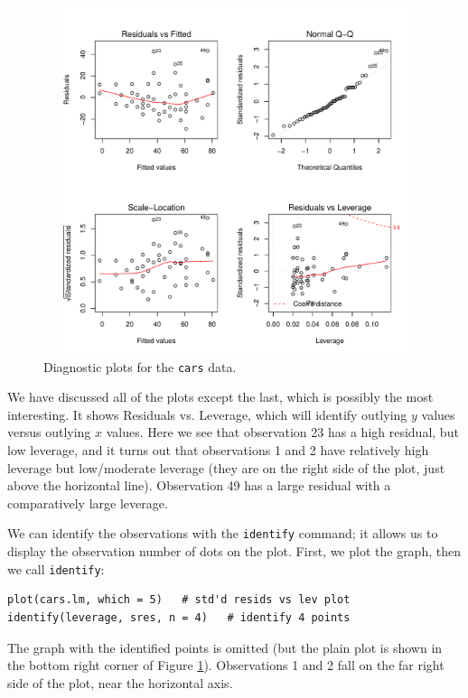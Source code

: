 \documentclass[captions=tableheading]{scrbook}
\begin{document}
\begin{figure}[ht!]
  \includegraphics[width=5in, height=4in]{img/Diagnostic-plots-cars.pdf}
  \caption[Diagnostic plots for the \texttt{cars} data]{\small Diagnostic plots for the \texttt{cars} data.}
  \label{fig:Diagnostic-plots-cars}
\end{figure}



We have discussed all of the plots except the last, which is possibly the most interesting. It shows Residuals vs. Leverage, which will identify outlying \(y\) values versus outlying \(x\) values. Here we see that observation 23 has a high residual, but low leverage, and it turns out that observations 1 and 2 have relatively high leverage but low/moderate leverage (they are on the right side of the plot, just above the horizontal line). Observation 49 has a large residual with a comparatively large leverage. 

We can identify the observations with the \texttt{identify} command; it allows us to display the observation number of dots on the plot. First, we plot the graph, then we call \texttt{identify}:


\begin{verbatim}
plot(cars.lm, which = 5)   # std'd resids vs lev plot
identify(leverage, sres, n = 4)   # identify 4 points
\end{verbatim}

The graph with the identified points is omitted (but the plain plot is shown in the bottom right corner of Figure \ref{fig:Diagnostic-plots-cars}). Observations 1 and 2 fall on the far right side of the plot, near the horizontal axis.
\end{document}
